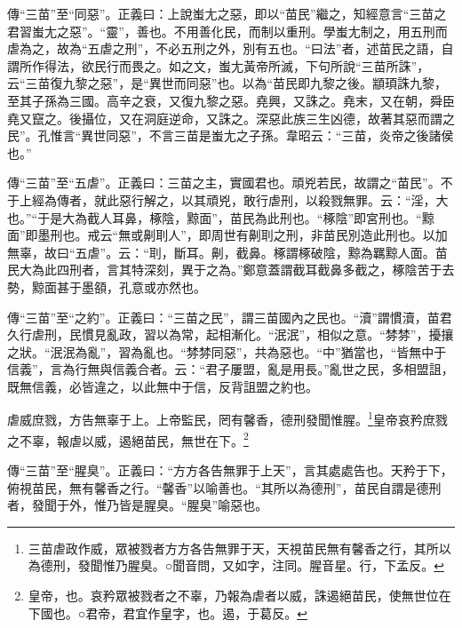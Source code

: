 {\noindent\zhuan{}\fzbyks 傳“三苗”至“同惡”。正義曰：上說蚩尢之惡，即以“苗民”繼之，知經意言“三苗之君習蚩尢之惡”。“靈”，善也。不用善化民，而制以重刑。學蚩尢制之，用五刑而虐為之，故為“五虐之刑”，不必五刑之外，別有五也。“曰法”者，述苗民之語，自謂所作得法，欲民行而畏之。如之文，蚩尢黃帝所滅，下句所說“三苗所誅”，云“三苗復九黎之惡”，是“異世而同惡”也。以為“苗民即九黎之後。顓頊誅九黎，至其子孫為三國。高辛之衰，又復九黎之惡。堯興，又誅之。堯末，又在朝，舜臣堯又竄之。後攝位，又在洞庭逆命，又誅之。深惡此族三生凶德，故著其惡而謂之民”。孔惟言“異世同惡”，不言三苗是蚩尢之子孫。韋昭云：“三苗，炎帝之後諸侯也。” \par}

{\noindent\zhuan{}\fzbyks 傳“三苗”至“五虐”。正義曰：三苗之主，實國君也。頑兇若民，故謂之“苗民”。不于上經為傳者，就此惡行解之，以其頑兇，敢行虐刑，以殺戮無罪。云：“淫，大也。”“于是大為截人耳鼻，椓陰，黥面”，苗民為此刑也。“椓陰”即宮刑也。“黥面”即墨刑也。戒云“無或劓刵人”，即周世有劓刵之刑，非苗民別造此刑也。以加無辜，故曰“五虐”。云：“刵，斷耳。劓，截鼻。椓謂椓破陰，黥為羈黥人面。苗民大為此四刑者，言其特深刻，異于之為。”鄭意蓋謂截耳截鼻多截之，椓陰苦于去勢，黥面甚于墨頟，孔意或亦然也。 \par}

{\noindent\zhuan{}\fzbyks 傳“三苗”至“之約”。正義曰：“三苗之民”，謂三苗國內之民也。“瀆”謂慣瀆，苗君久行虐刑，民慣見亂政，習以為常，起相漸化。“泯泯”，相似之意。“棼棼”，擾攘之狀。“泯泯為亂”，習為亂也。“棼棼同惡”，共為惡也。“中”猶當也，“皆無中于信義”，言為行無與信義合者。云：“君子屢盟，亂是用長。”亂世之民，多相盟詛，既無信義，必皆違之，以此無中于信，反背詛盟之約也。 \par}

虐威庶戮，方告無辜于上。上帝監民，罔有馨香，德刑發聞惟腥。\footnote{三苗虐政作威，眾被戮者方方各告無罪于天，天視苗民無有馨香之行，其所以為德刑，發聞惟乃腥臭。○聞音問，又如字，注同。腥音星。行，下孟反。}皇帝哀矜庶戮之不辜，報虐以威，遏絕苗民，無世在下。\footnote{皇帝，也。哀矜眾被戮者之不辜，乃報為虐者以威，誅遏絕苗民，使無世位在下國也。○君帝，君宜作皇字，也。遏，于葛反。}

{\noindent\zhuan{}\fzbyks 傳“三苗”至“腥臭”。正義曰：“方方各告無罪于上天”，言其處處告也。天矜于下，俯視苗民，無有馨香之行。“馨香”以喻善也。“其所以為德刑”，苗民自謂是德刑者，發聞于外，惟乃皆是腥臭。“腥臭”喻惡也。 \par}

